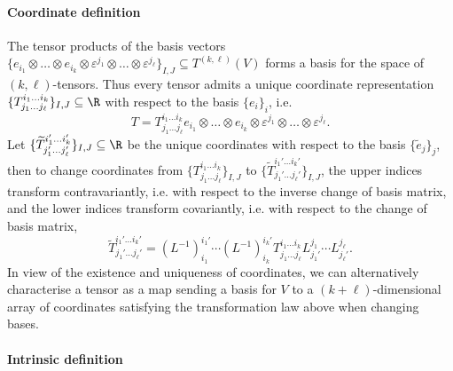 \documentclass[reqno]{amsart}
\theoremstyle{definition}
\theoremstyle{remark}
\renewcommand{\epsilon}{\varepsilon}
\begin{document}
\paragraph*{\textbf{Coordinate definition}}

The tensor products of the basis vectors $\{ e_{i_1} \otimes \dots \otimes e_{i_k} \otimes \epsilon^{j_1} \otimes \dots \otimes \epsilon^{j_\ell} \}_{I, J} \subseteq T^{(k, \ell)} (V)$ forms a basis for the space of $(k, \ell)$-tensors. Thus every tensor admits a unique coordinate representation $\{ T^{i_1\dots i_k}_{j_1 \dots j_\ell} \}_{I, J} \subseteq \R$ with respect to the basis $\{ e_i \}_i$, i.e.
	\[ T = T^{i_1\dots i_k}_{j_1 \dots j_\ell} e_{i_1} \otimes \dots \otimes e_{i_k} \otimes \epsilon^{j_1} \otimes \dots \otimes \epsilon^{j_\ell}. \]
Let $\{ \widetilde T^{i_1'\dots i_k'}_{j_1' \dots j_\ell'} \}_{I, J} \subseteq \R$ be the unique coordinates with respect to the basis $\{\widetilde e_j\}_j$, then to change coordinates from $\{ T^{i_1\dots i_k}_{j_1 \dots j_\ell} \}_{I, J}$ to $\{ \widetilde T^{i_1'\dots i_k'}_{j_1' \dots j_\ell'} \}_{I, J}$, the upper indices transform contravariantly, i.e. with respect to the inverse change of basis matrix, and the lower indices transform covariantly, i.e. with respect to the change of basis matrix, 
	\[ \widetilde T^{i_1'\dots i_k'}_{j_1' \dots j_\ell'} = (L^{-1})^{i_1'}_{i_1} \cdots  (L^{-1})^{i_k'}_{i_k} T^{i_1\dots i_k}_{j_1\dots j_\ell} L^{j_1}_{j_1'} \cdots L^{j_\ell}_{j_\ell'}. \]
In view of the existence and uniqueness of coordinates, we can alternatively characterise a tensor as a map sending a basis for $V$ to a $(k + \ell)$-dimensional array of coordinates satisfying the transformation law above when changing bases. 
	
\vspace{1em}
\paragraph*{\textbf{Intrinsic definition}}
\end{document}
